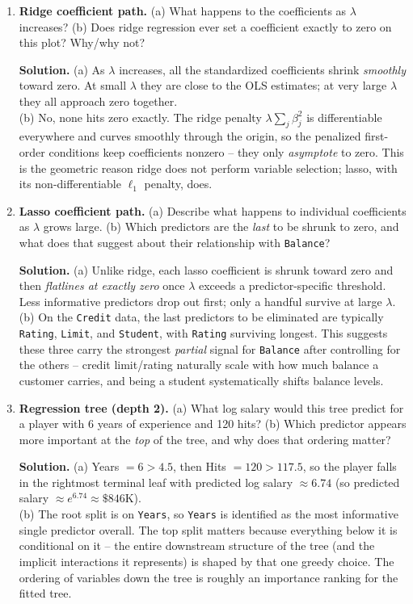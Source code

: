 \documentclass[11pt]{article}
\newcommand{\solution}[1]{%
  \par\medskip\noindent\textbf{Solution.} #1\par\medskip
}
\begin{document}
\begin{enumerate}[leftmargin=*]

\item \textbf{Ridge coefficient path.} (a) What happens to the coefficients as $\lambda$ increases? (b) Does ridge regression ever set a coefficient exactly to zero on this plot? Why/why not?

\solution{(a) As $\lambda$ increases, all the standardized coefficients shrink \emph{smoothly} toward zero. At small $\lambda$ they are close to the OLS estimates; at very large $\lambda$ they all approach zero together.\\
(b) No, none hits zero exactly. The ridge penalty $\lambda \sum_j \beta_j^2$ is differentiable everywhere and curves smoothly through the origin, so the penalized first-order conditions keep coefficients nonzero -- they only \emph{asymptote} to zero. This is the geometric reason ridge does not perform variable selection; lasso, with its non-differentiable $\ell_1$ penalty, does.}

\item \textbf{Lasso coefficient path.} (a) Describe what happens to individual coefficients as $\lambda$ grows large. (b) Which predictors are the \emph{last} to be shrunk to zero, and what does that suggest about their relationship with \texttt{Balance}?

\solution{(a) Unlike ridge, each lasso coefficient is shrunk toward zero and then \emph{flatlines at exactly zero} once $\lambda$ exceeds a predictor-specific threshold. Less informative predictors drop out first; only a handful survive at large $\lambda$.\\
(b) On the \texttt{Credit} data, the last predictors to be eliminated are typically \texttt{Rating}, \texttt{Limit}, and \texttt{Student}, with \texttt{Rating} surviving longest. This suggests these three carry the strongest \emph{partial} signal for \texttt{Balance} after controlling for the others -- credit limit/rating naturally scale with how much balance a customer carries, and being a student systematically shifts balance levels.}

\item \textbf{Regression tree (depth 2).} (a) What log salary would this tree predict for a player with 6 years of experience and 120 hits? (b) Which predictor appears more important at the \emph{top} of the tree, and why does that ordering matter?

\solution{(a) Years $= 6 > 4.5$, then Hits $= 120 > 117.5$, so the player falls in the rightmost terminal leaf with predicted log salary $\approx \mathbf{6.74}$ (so predicted salary $\approx e^{6.74} \approx \$846$K).\\
(b) The root split is on \texttt{Years}, so \texttt{Years} is identified as the most informative single predictor overall. The top split matters because everything below it is conditional on it -- the entire downstream structure of the tree (and the implicit interactions it represents) is shaped by that one greedy choice. The ordering of variables down the tree is roughly an importance ranking for the fitted tree.}


\end{enumerate}
\end{document}
